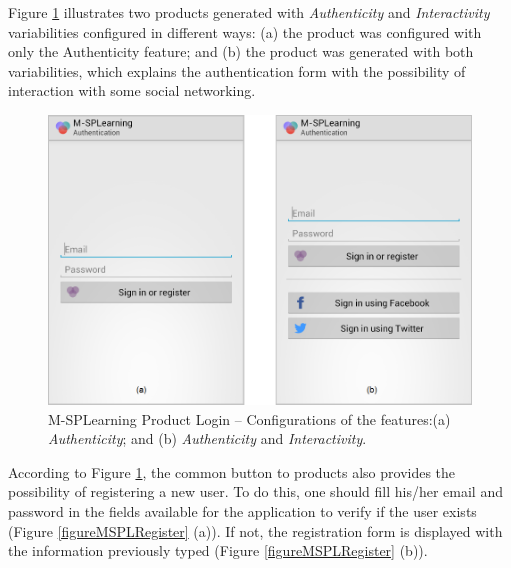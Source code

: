 Figure \ref{figureMSPLLogin} illustrates two products generated with \textit{Authenticity} and \textit{Interactivity} variabilities configured in different ways: (a) the product was configured with only the Authenticity feature; and (b) the product was generated with both variabilities, which explains the authentication form with the possibility of interaction with some social networking.

\begin{figure}[!ht]
\centering
\includegraphics[scale=0.335]{figures/section3/MSPLLogin}
\caption{M-SPLearning Product Login -- Configurations of the features:\newline(a) \textit{Authenticity}; and (b) \textit{Authenticity} and \textit{Interactivity}.}
\label{figureMSPLLogin}
\end{figure}

According to Figure \ref{figureMSPLLogin}, the common button to products also provides the possibility of registering a new user. To do this, one should fill his/her email and password in the fields available for the application to verify if the user exists (Figure \ref{figureMSPLRegister} (a)). If not, the registration form is displayed with the information previously typed (Figure \ref{figureMSPLRegister} (b)).

